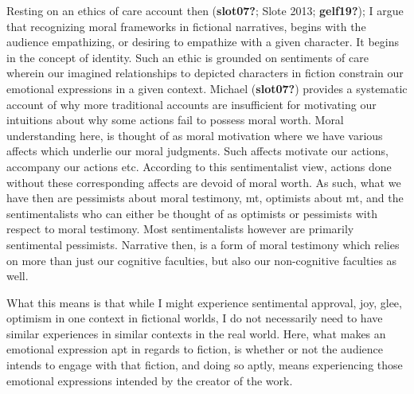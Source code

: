 \documentclass[12pt]{book}
\theoremstyle{definition}
\theoremstyle{remark}
\begin{document}
Resting on an ethics of care account then (\textbf{slot07?}; Slote 2013; \textbf{gelf19?}); I argue that recognizing moral frameworks in fictional narratives, begins with the audience empathizing, or desiring to empathize with a given character. It begins in the concept of identity. Such an ethic is grounded on sentiments of care wherein our imagined relationships to depicted characters in fiction constrain our emotional expressions in a given context. Michael (\textbf{slot07?}) provides a systematic account of why more traditional accounts are insufficient for motivating our intuitions about why some actions fail to possess moral worth. Moral understanding here, is thought of as moral motivation where we have various affects which underlie our moral judgments. Such affects motivate our actions, accompany our actions etc. According to this sentimentalist view, actions done without these corresponding affects are devoid of moral worth. As such, what we have then are pessimists about moral testimony, mt, optimists about mt, and the sentimentalists who can either be thought of as optimists or pessimists with respect to moral testimony. Most sentimentalists however are primarily sentimental pessimists. Narrative then, is a form of moral testimony which relies on more than just our cognitive faculties, but also our non-cognitive faculties as well.

What this means is that while I might experience sentimental approval, joy, glee, optimism in one context in fictional worlds, I do not necessarily need to have similar experiences in similar contexts in the real world. Here, what makes an emotional expression apt in regards to fiction, is whether or not the audience intends to engage with that fiction, and doing so aptly, means experiencing those emotional expressions intended by the creator of the work.
\end{document}
